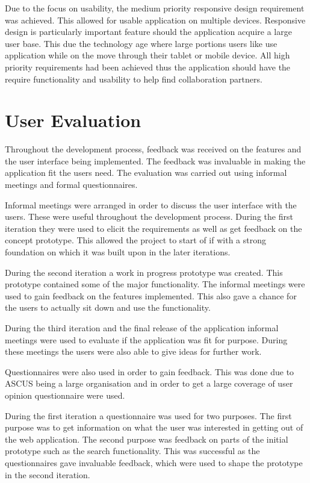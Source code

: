 \documentclass[a4paper,oneside,11pt]{report}
\begin{document}
Due to the focus on usability, the medium priority responsive design requirement was achieved. This allowed for usable application on multiple devices. Responsive design is particularly important feature should the application acquire a large user base. This due the technology age where large portions users like use application while on the move through their tablet or mobile device.
\pagebreak
All high priority requirements had been achieved thus the application should have the require functionality and usability to help find collaboration partners.

\section{User Evaluation}
Throughout the development process, feedback was received on the features and the user interface being implemented. The feedback was invaluable in making the application fit the users need. The evaluation was carried out using informal meetings and formal questionnaires.

Informal meetings were arranged in order to discuss the user interface with the users. These were useful throughout the development process. During the first iteration they were used to elicit the requirements as well as get feedback on the concept prototype.	 This allowed the project to start of if with a strong foundation on which it was built upon in the later iterations.

During the second iteration a work in progress prototype was created. This prototype contained some of the major functionality. The informal meetings were used to gain feedback on the features implemented.  This also gave a chance for the users to actually sit down and use the functionality.

During the third iteration and the final release of the application informal meetings were used to evaluate if the application was fit for purpose. During these meetings the users were also able to give ideas for further work.

Questionnaires were also used in order to gain feedback. This was done due to ASCUS being a large organisation and in order to get a large coverage of user opinion questionnaire were used.

During the first iteration a questionnaire was used for two purposes. The first purpose was to get information on what the user was interested in getting out of the web application. The second purpose was feedback on parts of the initial prototype such as the search functionality. This was successful as the questionnaires gave invaluable feedback, which were used to shape the prototype in the second iteration.
\end{document}
